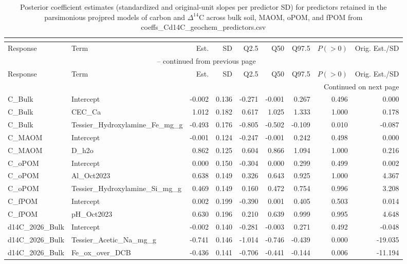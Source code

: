 \documentclass[preprint,12pt]{elsarticle}
\begin{document}
\begin{landscape}
\begin{longtable}{llrrrrrrr}
\caption{Posterior coefficient estimates (standardized and original-unit slopes per predictor SD) for predictors retained in the parsimonious projpred models of carbon and $\Delta^{14}\text{C}$ across bulk soil, MAOM, oPOM, and fPOM from coeffs_Cd14C_geochem_predictors.csv}\\
\label{tab:coeffs_cd14c}\\
\toprule
Response & Term & Est. & SD & Q2.5 & Q50 & Q97.5 & $P(>0)$ & Orig. Est./SD \\
\midrule
\endfirsthead
\multicolumn{9}{c}{{\tablename\ \thetable{} -- continued from previous page}} \\
\toprule
Response & Term & Est. & SD & Q2.5 & Q50 & Q97.5 & $P(>0)$ & Orig. Est./SD \\
\midrule
\endhead
\midrule \multicolumn{9}{r}{{Continued on next page}} \\ \endfoot
\bottomrule \endlastfoot
C\_Bulk & Intercept & -0.002 & 0.136 & -0.271 & -0.001 & 0.267 & 0.496 & 0.000 \\
C\_Bulk & CEC\_Ca & 1.012 & 0.182 & 0.617 & 1.025 & 1.333 & 1.000 & 0.178 \\
C\_Bulk & Tessier\_Hydroxylamine\_Fe\_mg\_g & -0.493 & 0.176 & -0.805 & -0.502 & -0.109 & 0.010 & -0.087 \\
C\_MAOM & Intercept & -0.001 & 0.124 & -0.247 & -0.001 & 0.242 & 0.498 & 0.000 \\
C\_MAOM & D\_h2o & 0.862 & 0.125 & 0.604 & 0.866 & 1.094 & 1.000 & 0.216 \\
C\_oPOM & Intercept & 0.000 & 0.150 & -0.304 & 0.000 & 0.299 & 0.499 & 0.002 \\
C\_oPOM & Al\_Oct2023 & 0.638 & 0.149 & 0.326 & 0.643 & 0.925 & 1.000 & 4.367 \\
C\_oPOM & Tessier\_Hydroxylamine\_Si\_mg\_g & 0.469 & 0.149 & 0.160 & 0.472 & 0.754 & 0.996 & 3.208 \\
C\_fPOM & Intercept & 0.002 & 0.199 & -0.390 & 0.001 & 0.405 & 0.503 & 0.014 \\
C\_fPOM & pH\_Oct2023 & 0.630 & 0.196 & 0.210 & 0.639 & 0.999 & 0.995 & 4.648 \\
d14C\_2026\_Bulk & Intercept & -0.002 & 0.140 & -0.281 & -0.003 & 0.271 & 0.492 & -0.048 \\
d14C\_2026\_Bulk & Tessier\_Acetic\_Na\_mg\_g & -0.741 & 0.146 & -1.014 & -0.746 & -0.439 & 0.000 & -19.035 \\
d14C\_2026\_Bulk & Fe\_ox\_over\_DCB & -0.436 & 0.141 & -0.706 & -0.441 & -0.144 & 0.006 & -11.194 \\

\end{longtable}
\end{landscape}
\end{document}
